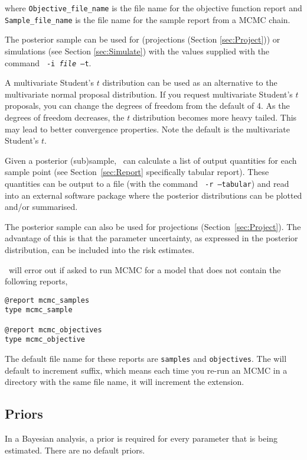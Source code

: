 where \texttt{Objective\_file\_name} is the file name for the objective function report and \texttt{Sample\_file\_name} is the file name for the sample report from a MCMC chain.

The posterior sample can be used for (projections (Section \ref{sec:Project})) or simulations (see Section \ref{sec:Simulate}) with the values supplied with the command \texttt{\cname\ -i \emph{file} --t}.

A multivariate Student's $t$ distribution can be used as an alternative to the multivariate normal proposal distribution. If you request multivariate Student's $t$ proposals, you can change the degrees of freedom from the default of 4. As the degrees of freedom decreases, the $t$ distribution becomes more heavy tailed. This may lead to better convergence properties. Note the default is the multivariate Student's $t$.

Given a posterior (sub)sample, \CNAME\ can calculate a list of output quantities for each sample point (see Section~\ref{sec:Report} specifically tabular report). These quantities can be output to a file (with the command \texttt{\cname\ -r --tabular}) and read into an external software package where the posterior distributions can be plotted and/or summarised.

The posterior sample can also be used for projections (Section~\ref{sec:Project}). The advantage of this is that the parameter uncertainty, as expressed in the posterior distribution, can be included into the risk estimates.

\CNAME\ will error out if asked to run MCMC for a model that does not contain the following reports,
{\small{\begin{verbatim}
@report mcmc_samples
type mcmc_sample

@report mcmc_objectives
type mcmc_objective
\end{verbatim}}}

The default file name for these reports are \texttt{samples} and \texttt{objectives}. The  will default to increment suffix, which means each time you re-run an MCMC in a directory with the same file name, it will increment the extension.

\subsection{Priors\label{sec:Priors}}

In a Bayesian analysis, a prior is required for every parameter that is being estimated. There are no default priors.

